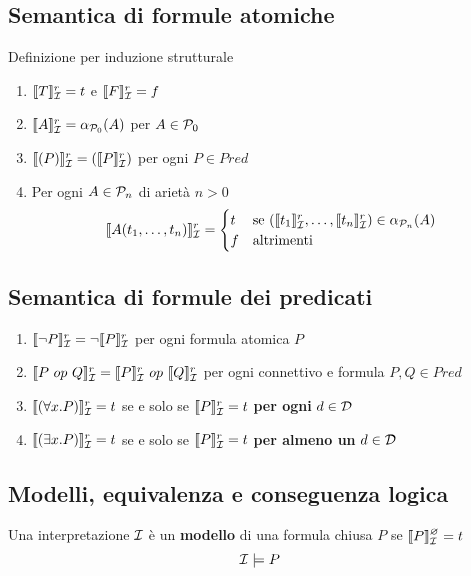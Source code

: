\documentclass{article}
\begin{document}
\subsection*{Semantica di formule atomiche}
Definizione per induzione strutturale
\begin{enumerate}
    \item \(\llbracket T \rrbracket_{\mathcal{I}}^r = t\) e \(\llbracket F \rrbracket_{\mathcal{I}}^r = f\)
    \item \(\llbracket A \rrbracket_{\mathcal{I}}^r = \alpha_{\mathcal{P}_0}(A)\) per \(A \in \mathcal{P}_0\)
    \item \(\llbracket (P) \rrbracket_{\mathcal{I}}^r = (\llbracket P \rrbracket_{\mathcal{I}}^r)\) per ogni \(P \in Pred\)
    \item Per ogni \(A \in \mathcal{P}_n\) di arietà \(n > 0\)
    \[
        \llbracket A(t_1, \ldots, t_n) \rrbracket_{\mathcal{I}}^r = 
        \begin{cases}
            t & \text{se } (\llbracket t_1 \rrbracket_{\mathcal{I}}^r, \ldots, \llbracket t_n \rrbracket_{\mathcal{I}}^r) \in \alpha_{\mathcal{P}_n}(A) \\
            f & \text{altrimenti}
        \end{cases}
    \]
\end{enumerate}
\subsection*{Semantica di formule dei predicati}
\begin{enumerate}
    \item \(\llbracket \lnot P \rrbracket_{\mathcal{I}}^r = \lnot\llbracket P \rrbracket_{\mathcal{I}}^r\) per ogni formula atomica \(P\)
    \item \(\llbracket P\ op\ Q \rrbracket_{\mathcal{I}}^r = \llbracket P \rrbracket_{\mathcal{I}}^r\ op\ \llbracket Q \rrbracket_{\mathcal{I}}^r\) per ogni connettivo e formula \(P, Q \in Pred\)
    \item \(\llbracket (\forall x . P) \rrbracket_{\mathcal{I}}^r = t\) se e solo se \(\llbracket P \rrbracket_{\mathcal{I}}^r = t\) \textbf{per ogni} \(d \in \mathcal{D}\)
    \item \(\llbracket (\exists x . P) \rrbracket_{\mathcal{I}}^r = t\) se e solo se \(\llbracket P \rrbracket_{\mathcal{I}}^r = t\) \textbf{per almeno un} \(d \in \mathcal{D}\)
\end{enumerate}
\subsection*{Modelli, equivalenza e conseguenza logica}
Una interpretazione \(\mathcal{I}\) è un \textbf{modello} di una formula chiusa \(P\) se \(\llbracket P \rrbracket_{\mathcal{I}}^\varnothing = t\)
\[\mathcal{I} \models P\]
\end{document}
